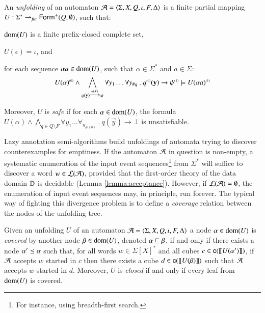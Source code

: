 \documentclass{llncs}
\begin{document}
\begin{definition}\label{def:unfolding}
  An \emph{unfolding} of an automaton $\mathcal{A} =
  \langle \Sigma,X,Q,\iota,F,\Delta \rangle$ is a finite partial mapping $U :
  \Sigma^* \rightharpoonup_{\mathit{fin}} \mathsf{Form}^+(Q,\emptyset)$,
  such that: \begin{compactenum}
  \item\label{it1:unfolding} $\mathrm{dom}(U)$ is a finite prefix-closed
    complete set,
  \item\label{it2:unfolding} $U(\epsilon) = \iota$, and
  \item\label{it3:unfolding} for each sequence $\alpha a \in \mathrm{dom}(U)$,
    such that $\alpha \in \Sigma^*$ and $a \in \Sigma$:
    \[{U(\alpha)}^{\scriptscriptstyle{({0})}} \wedge
    \bigwedge_{q(\mathbf y) \xrightarrow{{\scriptscriptstyle a(X)}}_{{\scriptstyle }} \psi} \forall y_1 \ldots
    \forall y_{\#q} ~.~ {q}^{\scriptscriptstyle{({0})}}(\mathbf y) \rightarrow
    {\psi}^{\scriptscriptstyle{({1})}} \models {U(\alpha a)}^{\scriptscriptstyle{({1})}}\]
  \end{compactenum}
  Moreover, $U$ is \emph{safe} if for each $\alpha \in \mathrm{dom}(U)$, the
  formula $U(\alpha) \wedge \bigwedge_{q \in Q \setminus F} \forall
  y_1 \ldots \forall_{y_{\#(q)}} ~.~ q(\vec{y}) \rightarrow \bot$ is
  unsatisfiable. 
\end{definition}

Lazy annotation semi-algorithms \cite{McMillan06,McMillan14} build
unfoldings of automata trying to discover counterexamples for
emptiness. If the automaton $\mathcal{A}$ in question is non-empty, a
systematic enumeration of the input event sequences\footnote{For
  instance, using breadth-first search.} from $\Sigma^*$ will suffice
to discover a word $w \in {\mathcal L}({\mathcal{A}})$, provided that the first-order
theory of the data domain $\mathbb{D}$ is decidable (Lemma
\ref{lemma:acceptance}). However, if ${\mathcal L}({\mathcal{A}}) = \emptyset$, the
enumeration of input event sequences may, in principle, run
forever. The typical way of fighting this divergence problem is to
define a \emph{coverage} relation between the nodes of the unfolding
tree.

\begin{definition}\label{def:coverage}
  Given an unfolding $U$ of an automaton $\mathcal{A} =
  \langle \Sigma,X,Q,\iota,F,\Delta \rangle$ a node $\alpha \in \mathrm{dom}(U)$ is
  \emph{covered} by another node $\beta \in \mathrm{dom}(U)$, denoted $\alpha
  \sqsubseteq \beta$, if and only if there exists a node $\alpha' \preceq
  \alpha$ such that, for all words $w \in \Sigma[X]^*$ and all cubes
  $c \in \mathsf{c}({{\bf [\![} U(\alpha') {\bf ]\!]}})$, if $\mathcal{A}$ accepts $w$ started in $c$
  then there exists a cube $d \in \mathsf{c}({{\bf [\![} U(\beta) {\bf ]\!]}})$ such that
  $\mathcal{A}$ accepts $w$ started in $d$. Moreover, $U$ is \emph{closed} if
  and only if every leaf from $\mathrm{dom}(U)$ is covered.
\end{definition}
\end{document}
